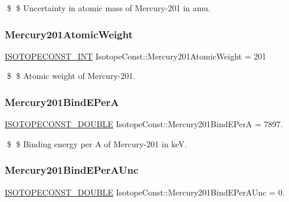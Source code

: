 \$ \$ Uncertainty in atomic mass of Mercury-\/201 in amu. \mbox{\label{group___isotope_const-_mercury-_hg201_gaad5dd2a9a78267fbe5a58549e4e68c5f}} 
\subsubsection{\texorpdfstring{Mercury201\+Atomic\+Weight}{Mercury201AtomicWeight}}
{\footnotesize\ttfamily \mbox{\hyperlink{group___isotope_const-_macros_ga5f18360b3e99483a35c32d789e62621c}{I\+S\+O\+T\+O\+P\+E\+C\+O\+N\+S\+T\+\_\+\+I\+NT}} Isotope\+Const\+::\+Mercury201\+Atomic\+Weight = 201}

\$ \$ Atomic weight of Mercury-\/201. \mbox{\label{group___isotope_const-_mercury-_hg201_ga028896ebaa20fd5eed0e697ac6767bd7}} 
\subsubsection{\texorpdfstring{Mercury201\+Bind\+E\+PerA}{Mercury201BindEPerA}}
{\footnotesize\ttfamily \mbox{\hyperlink{group___isotope_const-_macros_ga8f45a7272ce02c0b4c65c44636ed719a}{I\+S\+O\+T\+O\+P\+E\+C\+O\+N\+S\+T\+\_\+\+D\+O\+U\+B\+LE}} Isotope\+Const\+::\+Mercury201\+Bind\+E\+PerA = 7897.}

\$ \$ Binding energy per A of Mercury-\/201 in keV. \mbox{\label{group___isotope_const-_mercury-_hg201_gafaddb2ca26bca56e667c56fed6168af1}} 
\subsubsection{\texorpdfstring{Mercury201\+Bind\+E\+Per\+A\+Unc}{Mercury201BindEPerAUnc}}
{\footnotesize\ttfamily \mbox{\hyperlink{group___isotope_const-_macros_ga8f45a7272ce02c0b4c65c44636ed719a}{I\+S\+O\+T\+O\+P\+E\+C\+O\+N\+S\+T\+\_\+\+D\+O\+U\+B\+LE}} Isotope\+Const\+::\+Mercury201\+Bind\+E\+Per\+A\+Unc = 0.}

